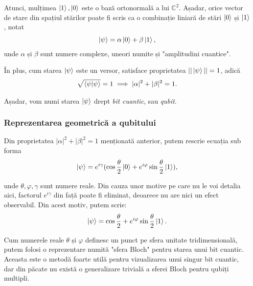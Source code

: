 Atunci, mulțimea {$\ket{1}, \ket{0}$} este o bază ortonormală a lui $\mathbb{C}^2$. Așadar, orice vector de stare din spațiul stărilor poate fi scris ca o combinație liniară de stări $\ket{0}$ și $\ket{1}$, notat
\[
\ket{\psi} = \alpha\ket{0} + \beta\ket{1},
\]
unde $\alpha$ și $\beta$ sunt numere complexe, uneori numite și "amplitudini cuantice".

În plus, cum starea $\ket{\psi}$ este un versor, satisface proprietatea $||\ket{\psi}|| = 1$, adică
\[
\sqrt{\braket{\psi|\psi}} = 1 \implies |\alpha|^2 + |\beta|^2 = 1.
\]

Așadar, vom numi starea $\ket{\psi}$ drept \textit{bit cuantic}, sau \textit{qubit}.

\subsubsection{Reprezentarea geometrică a qubitului}

Din proprietatea $|\alpha|^2 + |\beta|^2 = 1$ menționată anterior, putem rescrie ecuația sub forma 
\[
\ket{\psi} = e^{i\gamma}(\cos \frac{\theta}{2}\ket{0} + e^{i\varphi}\sin\frac{\theta}{2}\ket{1}),
\]

unde $\theta, \varphi, \gamma$ sunt numere reale. Din cauza unor motive pe care nu le voi detalia aici, factorul $e^{i\gamma}$ din față poate fi eliminat, deoarece nu are nici un efect observabil. Din acest motiv, putem scrie:
\[
\ket{\psi} = \cos \frac{\theta}{2} + e^{i\varphi}\sin \frac{\theta}{2}\ket{1}.
\]

Cum numerele reale $\theta$ și $\varphi$ definesc un punct pe sfera unitate tridimensională, putem folosi o reprezentare numită "sfera Bloch" pentru starea unui bit cuantic. Aceasta este o metodă foarte utilă pentru vizualizarea unui singur bit cuantic, dar din păcate nu există o generalizare trivială a sferei Bloch pentru qubiți multipli. 

